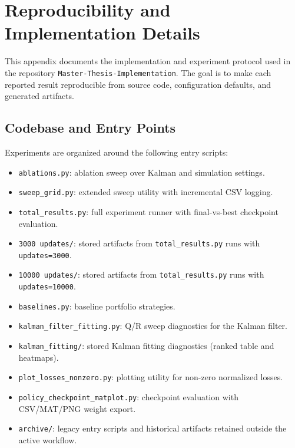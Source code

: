 % 

\chapter{Reproducibility and Implementation Details}
\label{app:reproducibility}

This appendix documents the implementation and experiment protocol used in the
repository \texttt{Master-Thesis-Implementation}. The goal is to make each
reported result reproducible from source code, configuration defaults, and
generated artifacts.

\section{Codebase and Entry Points}

Experiments are organized around the following entry scripts:
\begin{itemize}
    \item \texttt{ablations.py}: ablation sweep over Kalman and simulation settings.
    \item \texttt{sweep\_grid.py}: extended sweep utility with incremental CSV logging.
    \item \texttt{total\_results.py}: full experiment runner with final-vs-best checkpoint evaluation.
    \item \texttt{3000 updates/}: stored artifacts from \texttt{total\_results.py} runs with \texttt{updates=3000}.
    \item \texttt{10000 updates/}: stored artifacts from \texttt{total\_results.py} runs with \texttt{updates=10000}.
    \item \texttt{baselines.py}: baseline portfolio strategies.
    \item \texttt{kalman\_filter\_fitting.py}: Q/R sweep diagnostics for the Kalman filter.
    \item \texttt{kalman\_fitting/}: stored Kalman fitting diagnostics (ranked table and heatmaps).
    \item \texttt{plot\_losses\_nonzero.py}: plotting utility for non-zero normalized losses.
    \item \texttt{policy\_checkpoint\_matplot.py}: checkpoint evaluation with CSV/MAT/PNG weight export.
    \item \texttt{archive/}: legacy entry scripts and historical artifacts retained outside the active workflow.
\end{itemize}


